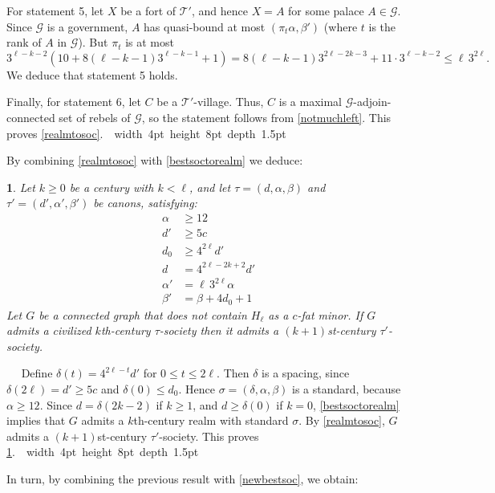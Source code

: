 \documentclass[titlepage,11pt]{article}
\newcommand\blackslug{\hbox{\hskip 1pt \vrule width 4pt height 8pt depth 1.5pt
		\hskip 1pt}}
\newcommand\bbox{\hfill \quad \blackslug \bigbreak}
\newcommand{\mac}{\mathcal}
\newtheorem{thm}{}[section]
\newcommand{\Proof}{\noindent{\bf Proof.}\ \ }
\begin{document}
	For statement 5, let $X$ be a fort of $\mac T'$, and hence $X=A$ for some palace $A\in \mac G$.  Since $\mac G$ is a
	government, $A$ has quasi-bound at most
	$(\pi_t\alpha, \beta')$
	(where $t$ is the rank of $A$ in $\mac G$). But $\pi_t$ is at most
	$$3^{\ell-k-2}(10+8(\ell-k-1)3^{\ell-k-1}+1)=8(\ell-k-1)3^{2\ell-2k-3} + 11\cdot 3^{\ell-k-2}\le \ell\,3^{2\ell}.$$
	We deduce that statement 5 holds.
	
	Finally, for statement 6, let $C$ be a $\mac T'$-village. Thus, $C$ is a maximal $\mac G$-adjoin-connected set of rebels of 
	$\mac G$,
	so the statement follows from \ref{notmuchleft}. This proves \ref{realmtosoc}.~\bbox
	
	By combining \ref{realmtosoc} with \ref{bestsoctorealm} we deduce:
	
	\begin{thm}\label{bestsoctosoc}
		Let $k\ge 0$ be a century with $k<\ell$, and let $\tau=(d,\alpha,\beta)$ and $\tau'=(d', \alpha', \beta')$ be canons, 
		satisfying:
		\begin{align*}
			\alpha&\ge 12\\
			d'&\ge 5c\\
			d_0&\ge 4^{2\ell}d'\\
			d &= 4^{2\ell -2k+2} d'\\
			\alpha'&=\ell\,3^{2\ell}\alpha\\
			\beta' &= \beta+4d_0+1
		\end{align*}
		Let $G$ be a connected graph that does not contain $H_\ell$ as a $c$-fat minor. If $G$ admits a civilized $k$th-century $\tau$-society
		then it admits a $(k+1)$st-century $\tau'$-society. 
	\end{thm}
	\Proof
	Define $\delta(t) = 4^{2\ell-t}d'$ for $0\le t\le 2\ell$. Then $\delta$ is a spacing, since $\delta(2\ell)=d'\ge 5c$ and 
	$\delta(0)\le d_0$. Hence $\sigma=(\delta,\alpha,\beta)$ is a standard, because $\alpha\ge 12$.
	Since $d=\delta(2k-2)$ if $k\ge 1$, and $d\ge \delta(0)$ if $k=0$, \ref{bestsoctorealm} implies that $G$ admits a $k$th-century realm with standard $\sigma$.
	By \ref{realmtosoc}, $G$ admits a $(k+1)$st-century $\tau'$-society. This proves \ref{bestsoctosoc}.~\bbox
	
	In turn, by combining the previous result with \ref{newbestsoc}, we obtain:
	
\end{document}
